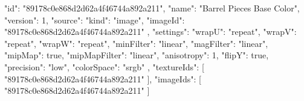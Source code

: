 {
  "id": "89178c0e868d2d62a4f46744a892a211",
  "name": "Barrel Pieces Base Color",
  "version": 1,
  "source": {
    "kind": "image",
    "imageId": "89178c0e868d2d62a4f46744a892a211"
  },
  "settings": {
    "wrapU": "repeat",
    "wrapV": "repeat",
    "wrapW": "repeat",
    "minFilter": "linear",
    "magFilter": "linear",
    "mipMap": true,
    "mipMapFilter": "linear",
    "anisotropy": 1,
    "flipY": true,
    "precision": "low",
    "colorSpace": "srgb"
  },
  "textureIds": [
    "89178c0e868d2d62a4f46744a892a211"
  ],
  "imageIds": [
    "89178c0e868d2d62a4f46744a892a211"
  ]
}
